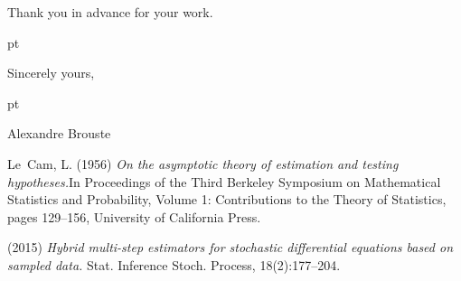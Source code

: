 \documentclass[11pt, a4paper,draft]{article}
\begin{document}
Thank you in advance for your work.

\thispagestyle{empty}

 pt

\begin{flushright}
Sincerely yours,
\end{flushright}

 pt

\begin{flushright}
Alexandre Brouste 
\end{flushright}

{\footnotesize

\begin{thebibliography}{00}


 {Le~Cam, L.} (1956)  {\it On the asymptotic theory of estimation and testing hypotheses.}In Proceedings of the Third Berkeley Symposium on Mathematical Statistics and Probability, Volume 1: Contributions to the Theory of Statistics, pages 129–156, University of California Press.  

 (2015) {\it Hybrid multi-step estimators for stochastic differential equations based
on sampled data.} Stat. Inference Stoch. Process, 18(2):177–204.

 

  
\end{thebibliography} }
\end{document}
